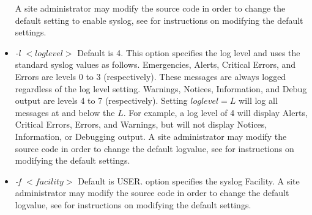 \begin{itemize}
{A site administrator may modify the source code in order to change the default setting to enable syslog,  see \cite{massey08tech} for instructions on modifying the default settings.
}

\item{ \emph{-l $<loglevel>$} Default is 4.  This option specifies the log level and uses the standard syslog values as follows.
Emergencies, Alerts, Critical Errors, and Errors are levels 0 to 3 (respectively).
These messages are always logged regardless of the log level setting.
Warnings, Notices, Information, and Debug output are levels 4 to 7 (respectively).
Setting $loglevel = L$ will log all messages at and below the $L$.
For example, a log level of 4 will display Alerts, Critical Errors, Errors, and Warnings, but will not display Notices, Information, or Debugging output.
A site administrator may modify the source code in order to change the default logvalue,  see \cite{massey08tech} for instructions on modifying the default settings.
}

\item{ \emph{-f $<facility>$} Default is USER. option specifies the syslog Facility.
A site administrator may modify the source code in order to change the default logvalue,  see \cite{massey08tech} for instructions on modifying the default settings.    
}

\end{itemize}
